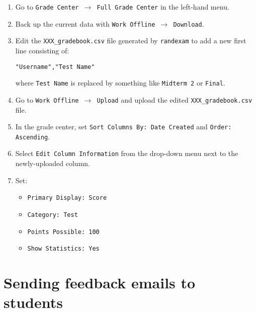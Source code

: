 \documentclass{article}
\begin{document}
\begin{enumerate}
\item Go to \texttt{Grade Center $\to$ Full Grade Center} in the
  left-hand menu.
\item Back up the current data with \texttt{Work Offline $\to$
    Download}.
\item Edit the \texttt{XXX_gradebook.csv} file generated by
  \texttt{randexam} to add a new first line consisting of:
  \begin{center}
    \texttt{"Username","Test Name"}
  \end{center}
  where \texttt{Test Name} is replaced by something like
  \texttt{Midterm 2} or \texttt{Final}.
\item Go to \texttt{Work Offline $\to$ Upload} and upload the edited
  \texttt{XXX_gradebook.csv} file.
\item In the grade center, set \texttt{Sort Columns By: Date Created}
  and \texttt{Order: Ascending}.
\item Select \texttt{Edit Column Information} from the drop-down menu
  next to the newly-uploaded column.
\item Set:
  \begin{itemize}
  \item \texttt{Primary Display: Score}
  \item \texttt{Category: Test}
  \item \texttt{Points Possible: 100}
  \item \texttt{Show Statistics: Yes}
  \end{itemize}
\end{enumerate}

\section{Sending feedback emails to students}
\end{document}

